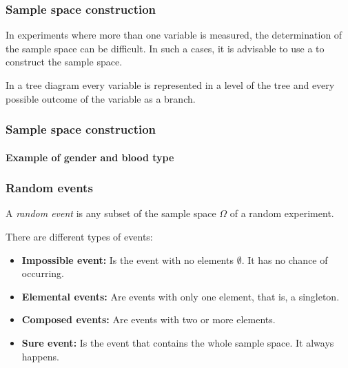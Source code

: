 \begin{frame}
\frametitle{Sample space construction}
In experiments where more than one variable is measured, the determination of the sample space can be difficult. 
In such a cases, it is advisable to use a  to construct the sample space. 

In a tree diagram every variable is represented in a level of the tree and every possible outcome of the variable as a
branch.
\end{frame}


\begin{frame}
\frametitle{Sample space construction}
\framesubtitle{Example of gender and blood type}

\begin{center}
\end{center}
\end{frame}


\begin{frame}
\frametitle{Random events}
\begin{definition}
A \emph{random event} is any subset of the sample space $\Omega$ of a random experiment.
\end{definition}

There are different types of events:
\begin{itemize}
\item \textbf{Impossible event:} Is the event with no elements $\emptyset$. It has no chance of occurring.
\item \textbf{Elemental events:} Are events with only one element, that is, a singleton.
\item \textbf{Composed events:} Are events with two or more elements.
\item \textbf{Sure event:} Is the event that contains the whole sample space. It always happens.
\end{itemize}
\end{frame}


